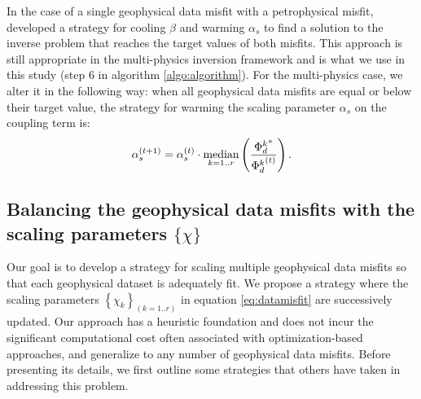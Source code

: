 \documentclass[extra, mreferee]{gji_joint} %
\begin{document}
In the case of a single geophysical data misfit with a petrophysical misfit, \citet{ggz389} developed a strategy for cooling $\beta$ and warming $\alpha_s$ to find a solution to the inverse problem that reaches the target values of both misfits. This approach is still appropriate in the multi-physics inversion framework and is what we use in this study (step 6 in algorithm \ref{algo:algorithm}). For the multi-physics case, we alter it in the following way: when all geophysical data misfits are equal or below their target value, the strategy for warming the scaling parameter $\alpha_s$ on the coupling term is:
\begin{equation}
\alpha_s^{(t+1)} = \alpha_s^{(t)} \cdot \mathop{\hbox{median}}\limits_{k=1..r} \left(\frac{{\Phi_d^{k}}^*}{{\Phi_d^{k}}^{(t)}}\right) \label{eq:alpha_warm}.
\end{equation}



\subsection{Balancing the geophysical data misfits with the scaling parameters $\{\chi\}$}


Our goal is to develop a strategy for scaling multiple geophysical data misfits so that each geophysical dataset is adequately fit. We propose a strategy where the scaling parameters $\left\{\chi_k\right\}_{(k=1..r)}$ in equation \eqref{eq:datamisfit} are successively updated. Our approach has a heuristic foundation and does not incur the significant computational cost often associated with optimization-based approaches, and generalize to any number of geophysical data misfits. Before presenting its details, we first outline some strategies that others have taken in addressing this problem.
\end{document}
